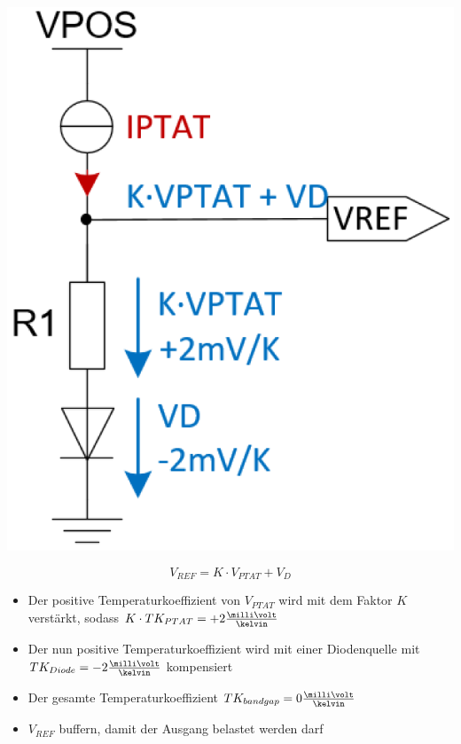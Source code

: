 \begin{minipage}[c]{0.2\columnwidth}
    \includegraphics[width=\columnwidth]{images/bandgap_referenz.png}
\end{minipage}
\hfill
\begin{minipage}[c]{0.78\columnwidth}
    $$ \boxed{ V_{REF} = K \cdot V_{PTAT} + V_D } $$
    \begin{itemize}
        \item Der positive Temperaturkoeffizient von $V_{PTAT}$ wird mit dem Faktor $K$ verstärkt, sodass 
            $K \cdot TK_{PTAT} = +2 \frac{\milli \volt}{\kelvin}$
        \item Der nun positive Temperaturkoeffizient wird mit einer Diodenquelle mit $TK_{Diode} = -2 \frac{\milli \volt}{\kelvin}$
            kompensiert
        \item Der gesamte Temperaturkoeffizient $TK_{bandgap} = 0 \frac{\milli \volt}{\kelvin}$
        \item $V_{REF}$ buffern, damit der Ausgang belastet werden darf
    \end{itemize}
\end{minipage}


